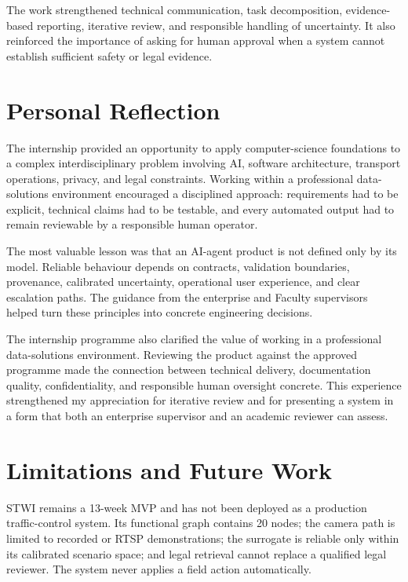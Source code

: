 \documentclass[12pt,a4paper]{report}
\begin{document}
The work strengthened technical communication, task decomposition, evidence-based reporting, iterative review, and responsible handling of uncertainty. It also reinforced the importance of asking for human approval when a system cannot establish sufficient safety or legal evidence.

\chapter{Personal Reflection}

The internship provided an opportunity to apply computer-science foundations to a complex interdisciplinary problem involving AI, software architecture, transport operations, privacy, and legal constraints. Working within a professional data-solutions environment encouraged a disciplined approach: requirements had to be explicit, technical claims had to be testable, and every automated output had to remain reviewable by a responsible human operator.

The most valuable lesson was that an AI-agent product is not defined only by its model. Reliable behaviour depends on contracts, validation boundaries, provenance, calibrated uncertainty, operational user experience, and clear escalation paths. The guidance from the enterprise and Faculty supervisors helped turn these principles into concrete engineering decisions.

The internship programme also clarified the value of working in a professional data-solutions environment. Reviewing the product against the approved programme made the connection between technical delivery, documentation quality, confidentiality, and responsible human oversight concrete. This experience strengthened my appreciation for iterative review and for presenting a system in a form that both an enterprise supervisor and an academic reviewer can assess.

\chapter{Limitations and Future Work}

STWI remains a 13-week MVP and has not been deployed as a production traffic-control system. Its functional graph contains 20 nodes; the camera path is limited to recorded or RTSP demonstrations; the surrogate is reliable only within its calibrated scenario space; and legal retrieval cannot replace a qualified legal reviewer. The system never applies a field action automatically.
\end{document}
